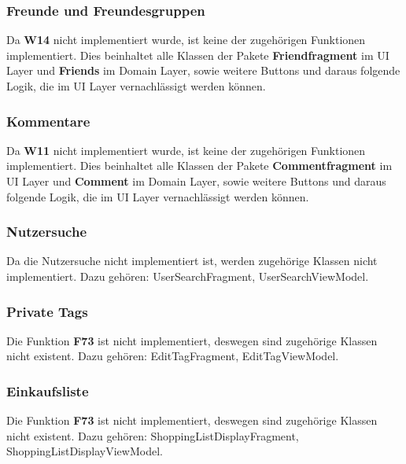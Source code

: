 \subsubsection{Freunde und Freundesgruppen}
Da \textbf{W14} nicht implementiert wurde, ist keine der zugehörigen Funktionen implementiert. Dies beinhaltet alle Klassen der Pakete \textbf{Friendfragment} im UI Layer und \textbf{Friends} im Domain Layer, sowie weitere Buttons und daraus folgende Logik, die im UI Layer vernachlässigt werden können.

\subsubsection{Kommentare}
Da \textbf{W11} nicht implementiert wurde, ist keine der zugehörigen Funktionen implementiert. Dies beinhaltet alle Klassen der Pakete \textbf{Commentfragment} im UI Layer und \textbf{Comment} im Domain Layer, sowie weitere Buttons und daraus folgende Logik, die im UI Layer vernachlässigt werden können.

\subsubsection{Nutzersuche}
Da die Nutzersuche nicht implementiert ist, werden zugehörige Klassen nicht implementiert. Dazu gehören: UserSearchFragment, UserSearchViewModel.

\subsubsection{Private Tags}
Die Funktion \textbf{F73} ist nicht implementiert, deswegen sind zugehörige Klassen nicht existent. Dazu gehören: EditTagFragment, EditTagViewModel.

\subsubsection{Einkaufsliste} 
Die Funktion \textbf{F73} ist nicht implementiert, deswegen sind zugehörige Klassen nicht existent. Dazu gehören: ShoppingListDisplayFragment, ShoppingListDisplayViewModel.